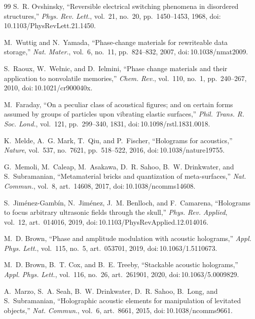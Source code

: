 \documentclass[11pt]{article}
\theoremstyle{definition}
\begin{document}
\begin{thebibliography}{99}
S.~R. Ovshinsky, ``Reversible electrical switching phenomena in disordered structures,''
\emph{Phys. Rev. Lett.}, vol.~21, no.~20, pp.~1450--1453, 1968,
doi:\,10.1103/PhysRevLett.21.1450.

M.~Wuttig and N.~Yamada, ``Phase-change materials for rewriteable data storage,''
\emph{Nat. Mater.}, vol.~6, no.~11, pp.~824--832, 2007, doi:\,10.1038/nmat2009.

S.~Raoux, W.~We{\l}nic, and D.~Ielmini, ``Phase change materials and their application to
nonvolatile memories,'' \emph{Chem. Rev.}, vol.~110, no.~1, pp.~240--267, 2010,
doi:\,10.1021/cr900040x.

M.~Faraday, ``On a peculiar class of acoustical figures; and on certain forms assumed by
groups of particles upon vibrating elastic surfaces,'' \emph{Phil. Trans. R. Soc. Lond.},
vol.~121, pp.~299--340, 1831, doi:\,10.1098/rstl.1831.0018.

K.~Melde, A.~G. Mark, T.~Qiu, and P.~Fischer, ``Holograms for acoustics,'' \emph{Nature},
vol.~537, no.~7621, pp.~518--522, 2016, doi:\,10.1038/nature19755.

G.~Memoli, M.~Caleap, M.~Asakawa, D.~R. Sahoo, B.~W. Drinkwater, and S.~Subramanian,
``Metamaterial bricks and quantization of meta-surfaces,'' \emph{Nat. Commun.}, vol.~8,
art.~14608, 2017, doi:\,10.1038/ncomms14608.

S.~Jim\'enez-Gamb\'in, N.~Jim\'enez, J.~M. Benlloch, and F.~Camarena, ``Holograms to focus
arbitrary ultrasonic fields through the skull,'' \emph{Phys. Rev. Applied}, vol.~12,
art.~014016, 2019, doi:\,10.1103/PhysRevApplied.12.014016.

M.~D. Brown, ``Phase and amplitude modulation with acoustic holograms,'' \emph{Appl. Phys.
Lett.}, vol.~115, no.~5, art.~053701, 2019, doi:\,10.1063/1.5110673.

M.~D. Brown, B.~T. Cox, and B.~E. Treeby, ``Stackable acoustic holograms,'' \emph{Appl.
Phys. Lett.}, vol.~116, no.~26, art.~261901, 2020, doi:\,10.1063/5.0009829.

A.~Marzo, S.~A. Seah, B.~W. Drinkwater, D.~R. Sahoo, B.~Long, and S.~Subramanian,
``Holographic acoustic elements for manipulation of levitated objects,'' \emph{Nat.
Commun.}, vol.~6, art.~8661, 2015, doi:\,10.1038/ncomms9661.


\end{thebibliography}
\end{document}
